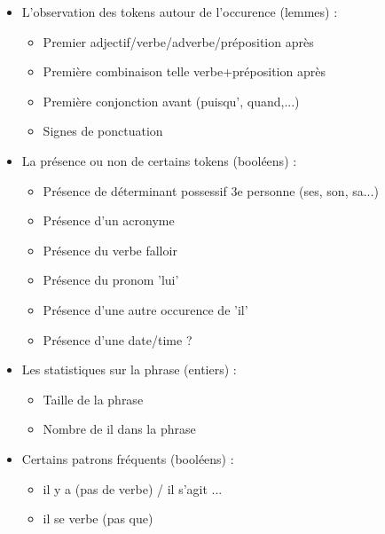 \documentclass[a4paper,12pt]{article}
\begin{document}
\begin{itemize}
 \item[\textbullet] L'observation des tokens autour de l'occurence (lemmes) :
 \begin{itemize}
  \item Premier adjectif/verbe/adverbe/préposition après
  \item Première combinaison telle verbe+préposition après
  \item Première conjonction avant (puisqu', quand,...)
  \item Signes de ponctuation
 \end{itemize}
 \item[\textbullet] La présence ou non de certains tokens (booléens) :
 \begin{itemize}
  \item Présence de déterminant possessif 3e personne (ses, son, sa...)
  \item Présence d'un acronyme
  \item Présence du verbe falloir
  \item Présence du pronom 'lui'
  \item Présence d'une autre occurence de 'il'
  \item Présence d'une date/time ?
 \end{itemize}
 \item[\textbullet] Les statistiques sur la phrase (entiers) :
 \begin{itemize}
  \item Taille de la phrase
  \item Nombre de \og{}il\fg{} dans la phrase
 \end{itemize}
 \item[\textbullet] Certains patrons fréquents (booléens) :
 \begin{itemize}
  \item il y a (pas de verbe) / il s'agit ...
  \item il se verbe (pas que)
 \end{itemize}
\end{itemize}
\end{document}
